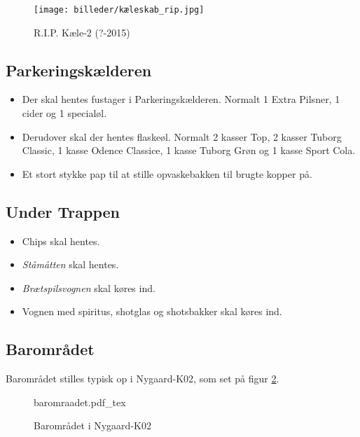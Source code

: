\begin{figure}[H]
	\centering
	\texttt{[image: billeder/kæleskab\_rip.jpg]}
	\caption{R.I.P. Kæle-2 (?-2015)}
	\label{fig:køleskab-rip}
\end{figure}

\subsection{Parkeringskælderen}
\label{sec:pre:hopper}

\begin{itemize}
	\item Der skal hentes fustager i Parkeringskælderen. Normalt 1
	Extra Pilsner, 1 cider og 1 specialøl.
	\item Derudover skal der hentes flaskeøl. Normalt 2 kasser Top, 2 kasser Tuborg Classic,
	1 kasse Odence Classice, 1 kasse Tuborg Grøn og 1 kasse Sport Cola.
	\item Et stort stykke pap til at stille opvaskebakken til brugte kopper på.
\end{itemize}

\subsection{Under Trappen}
\label{sec:pre:under-trappen}

\begin{itemize}
	\item Chips skal hentes.
	\item \textit{Ståmåtten} skal hentes.
	\item \textit{Brætspilsvognen} skal køres ind.
	\item Vognen med spiritus, shotglas og shotsbakker skal køres ind.
\end{itemize}

\subsection{Barområdet}
\label{sec:pre:baromradet}

Barområdet stilles typisk op i Nygaard-K02, som set på figur \ref{fig:baromraadet}.

\begin{figure}[t]
	\centering
	\def\svgwidth{\columnwidth}
	{\small{baromraadet.pdf_tex}}
	\caption{Barområdet i Nygaard-K02}
	\label{fig:baromraadet}
\end{figure}

